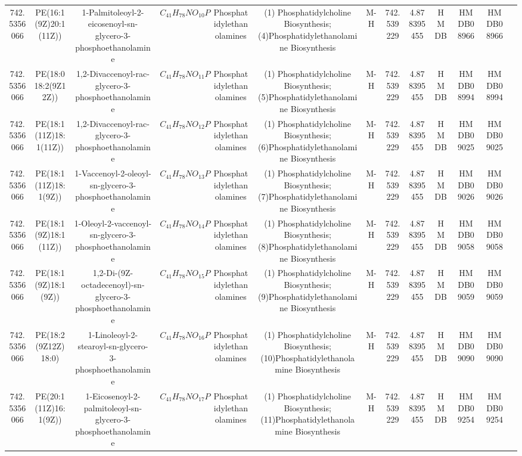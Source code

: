 \documentclass{WileyMSP-template}
\begin{document}
\begin{landscape}
\begin{table}
\begin{adjustbox}{center}
{\begin{tabular}{|c|c|c|c|c|c|c|c|c|c|c|c|c|}
            742.5356066 & PE(16:1(9Z)20:1(11Z)) & 1-Palmitoleoyl-2-eicosenoyl-sn-glycero-3-phosphoethanolamine & $ C_{41}H_{78}NO_{10}P $ & Phosphatidylethanolamines & (1) Phosphatidylcholine Biosynthesis; (4)Phosphatidylethanolamine Biosynthesis & M-H & 742.539229 & 4.878395455 & HMDB & HMDB08966 & HMDB08966\\
            742.5356066 & PE(18:018:2(9Z12Z)) & 1,2-Divaccenoyl-rac-glycero-3-phosphoethanolamine & $ C_{41}H_{78}NO_{11}P $ & Phosphatidylethanolamines & (1) Phosphatidylcholine Biosynthesis; (5)Phosphatidylethanolamine Biosynthesis & M-H & 742.539229 & 4.878395455 & HMDB & HMDB08994 & HMDB08994\\
            742.5356066 & PE(18:1(11Z)18:1(11Z)) & 1,2-Divaccenoyl-rac-glycero-3-phosphoethanolamine & $ C_{41}H_{78}NO_{12}P $ & Phosphatidylethanolamines & (1) Phosphatidylcholine Biosynthesis; (6)Phosphatidylethanolamine Biosynthesis & M-H & 742.539229 & 4.878395455 & HMDB & HMDB09025 & HMDB09025\\
            742.5356066 & PE(18:1(11Z)18:1(9Z)) & 1-Vaccenoyl-2-oleoyl-sn-glycero-3-phosphoethanolamine & $ C_{41}H_{78}NO_{13}P $ & Phosphatidylethanolamines & (1) Phosphatidylcholine Biosynthesis; (7)Phosphatidylethanolamine Biosynthesis & M-H & 742.539229 & 4.878395455 & HMDB & HMDB09026 & HMDB09026\\
            742.5356066 & PE(18:1(9Z)18:1(11Z)) & 1-Oleoyl-2-vaccenoyl-sn-glycero-3-phosphoethanolamine & $ C_{41}H_{78}NO_{14}P $ & Phosphatidylethanolamines & (1) Phosphatidylcholine Biosynthesis; (8)Phosphatidylethanolamine Biosynthesis & M-H & 742.539229 & 4.878395455 & HMDB & HMDB09058 & HMDB09058\\
            742.5356066 & PE(18:1(9Z)18:1(9Z)) & 1,2-Di-(9Z-octadecenoyl)-sn-glycero-3-phosphoethanolamine & $ C_{41}H_{78}NO_{15}P $ & Phosphatidylethanolamines & (1) Phosphatidylcholine Biosynthesis; (9)Phosphatidylethanolamine Biosynthesis & M-H & 742.539229 & 4.878395455 & HMDB & HMDB09059 & HMDB09059\\
            742.5356066 & PE(18:2(9Z12Z)18:0) & 1-Linoleoyl-2-stearoyl-sn-glycero-3-phosphoethanolamine & $ C_{41}H_{78}NO_{16}P $ & Phosphatidylethanolamines & (1) Phosphatidylcholine Biosynthesis; (10)Phosphatidylethanolamine Biosynthesis & M-H & 742.539229 & 4.878395455 & HMDB & HMDB09090 & HMDB09090\\
            742.5356066 & PE(20:1(11Z)16:1(9Z)) & 1-Eicosenoyl-2-palmitoleoyl-sn-glycero-3-phosphoethanolamine & $ C_{41}H_{78}NO_{17}P $ & Phosphatidylethanolamines & (1) Phosphatidylcholine Biosynthesis; (11)Phosphatidylethanolamine Biosynthesis & M-H & 742.539229 & 4.878395455 & HMDB & HMDB09254 & HMDB09254\\

\end{tabular}}
\end{adjustbox}
\end{table}
\end{landscape}
\end{document}
